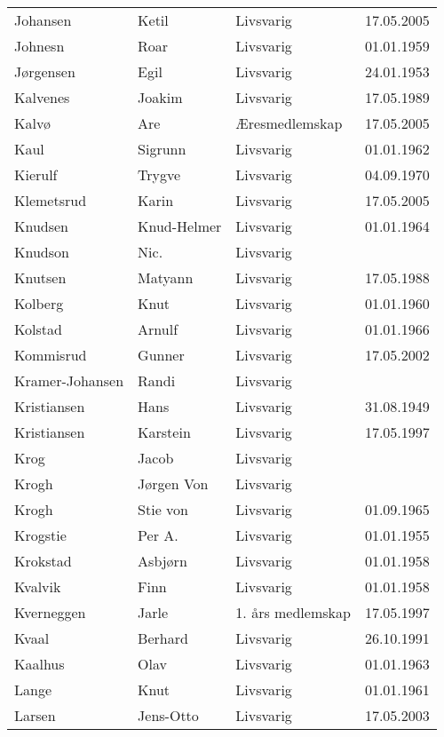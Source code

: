 \begin{longtable}{llll}
        Johansen 	&	Ketil	&	Livsvarig	&	17.05.2005	\\
        Johnesn	&	Roar	&	Livsvarig 	&	01.01.1959	\\
        Jørgensen	&	Egil	&	Livsvarig 	&	24.01.1953	\\
        Kalvenes	&	Joakim	&	Livsvarig 	&	17.05.1989	\\
        Kalvø 	&	Are 	&	Æresmedlemskap	&	17.05.2005	\\
        Kaul	&	Sigrunn	&	Livsvarig 	&	01.01.1962	\\
        Kierulf	&	Trygve	&	Livsvarig 	&	04.09.1970	\\
        Klemetsrud 	&	Karin	&	Livsvarig	&	17.05.2005	\\
        Knudsen	&	Knud-Helmer	&	Livsvarig 	&	01.01.1964	\\
        Knudson	&	Nic.	&	Livsvarig 	&		\\
        Knutsen	&	Matyann	&	Livsvarig 	&	17.05.1988	\\
        Kolberg	&	Knut	&	Livsvarig 	&	01.01.1960	\\
        Kolstad	&	Arnulf	&	Livsvarig 	&	01.01.1966	\\
        Kommisrud 	&	Gunner	&	Livsvarig	&	17.05.2002	\\
        Kramer-Johansen	&	Randi	&	Livsvarig 	&		\\
        Kristiansen	&	Hans	&	Livsvarig 	&	31.08.1949	\\
        Kristiansen 	&	Karstein	&	Livsvarig	&	17.05.1997	\\
        Krog	&	Jacob	&	Livsvarig 	&		\\
        Krogh	&	Jørgen Von	&	Livsvarig 	&		\\
        Krogh	&	Stie von	&	Livsvarig 	&	01.09.1965	\\
        Krogstie	&	Per A.	&	Livsvarig 	&	01.01.1955	\\
        Krokstad	&	Asbjørn	&	Livsvarig 	&	01.01.1958	\\
        Kvalvik	&	Finn	&	Livsvarig 	&	01.01.1958	\\
        Kverneggen 	&	Jarle 	&	1. års medlemskap	&	17.05.1997	\\
        Kvaal	&	Berhard	&	Livsvarig 	&	26.10.1991	\\
        Kaalhus	&	Olav	&	Livsvarig 	&	01.01.1963	\\
        Lange	&	Knut	&	Livsvarig 	&	01.01.1961	\\
        Larsen 	&	Jens-Otto	&	Livsvarig	&	17.05.2003	\\

\end{longtable}
